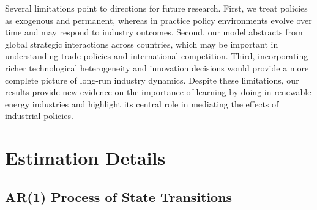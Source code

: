 \documentclass[12pt]{article}
\begin{document}
Several limitations point to directions for future research. First, we treat policies as exogenous and permanent, whereas in practice policy environments evolve over time and may respond to industry outcomes. Second, our model abstracts from global strategic interactions across countries, which may be important in understanding trade policies and international competition. Third, incorporating richer technological heterogeneity and innovation decisions would provide a more complete picture of long-run industry dynamics.
Despite these limitations, our results provide new evidence on the importance of learning-by-doing in renewable energy industries and highlight its central role in mediating the effects of industrial policies.

\newpage

\small
\singlespacing



\newpage
\setcounter{table}{0} \renewcommand{\thetable}{\Alph{section}.\arabic{table}}
\setcounter{figure}{0} \renewcommand{\thefigure}{\Alph{section}.\arabic{figure}}
\setcounter{section}{0} \renewcommand{\thesection}{\Alph{section}}
\setcounter{subsection}{0} \renewcommand{\thesubsection}{\Alph{section}.\arabic{subsection}}
\setcounter{subsubsection}{0} \renewcommand{\thesubsubsection}{\Alph{section}.\arabic{subsection}.\arabic{subsubsection}}
\setcounter{equation}{0} \renewcommand{\theequation}{\Alph{section}.\arabic{equation}}

\appendix
\addappheadtotoc


\section{Estimation Details}


\subsection{AR(1) Process of State Transitions}
\end{document}
